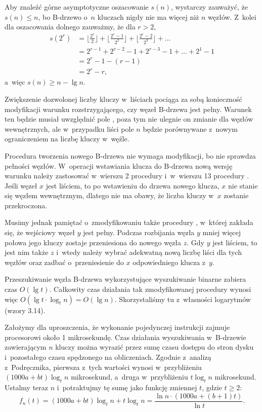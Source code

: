 Aby znaleźć górne asymptotyczne oszacowanie $s(n)$, wystarczy zauważyć, że $s(n)\le n$, bo B-drzewo o~$n$ kluczach nigdy nie ma więcej niż $n$ węzłów.
Z~kolei dla oszacowania dolnego zauważmy, że dla $r>2$,
\begin{align*}
	s(2^r) &= \biggl\lfloor\frac{2^r}{2}\biggr\rfloor+\biggl\lfloor\frac{2^r-1}{2^2}\biggr\rfloor+\biggl\lfloor\frac{2^r-2}{2^3}\biggr\rfloor+\dots \\
	&= 2^{r-1}+2^{r-2}-1+2^{r-3}-1+\dots+2^1-1 \\
	&= 2^r-1-(r-1) \\
	&= 2^r-r,
\end{align*}
a~więc $s(n)\ge n-\lg n$.

\exercise %
Zwiększenie dozwolonej liczby kluczy w~liściach pociąga za sobą konieczność modyfikacji warunku rozstrzygającego, czy węzeł B-drzewa jest pełny.
Warunek ten będzie musiał uwzględnić pole , poza tym nie ulegnie on zmianie dla węzłów wewnętrznych, ale w~przypadku liści pole $n$ będzie porównywane z~nowym ograniczeniem na liczbę kluczy w~węźle.

Procedura tworzenia nowego B-drzewa nie wymaga modyfikacji, bo nie sprawdza pełności węzłów.
W~operacji wstawiania klucza do B-drzewa nową wersję warunku należy zastosować w~wierszu 2 procedury  i~w~wierszu 13 procedury .
Jeśli węzeł $x$ jest liściem, to po wstawieniu do drzewa nowego klucza, $x$ nie stanie się węzłem wewnętrznym, dlatego nie ma obawy, że liczba kluczy w~$x$ zostanie przekroczona.

Musimy jednak pamiętać o~zmodyfikowaniu także procedury , w~której zakłada się, że wejściowy węzeł $y$ jest pełny.
Podczas rozbijania węzła $y$ mniej więcej połowa jego kluczy zostaje przeniesiona do nowego węzła $z$.
Gdy $y$ jest liściem, to jest nim także $z$ i~wtedy należy wybrać adekwatną nową liczbę liści dla tych węzłów oraz zadbać o~przeniesienie do $x$ odpowiedniego klucza z~$y$.

\exercise %
Przeszukiwanie węzła B-drzewa wykorzystujące wyszukiwanie binarne zabiera czas $O(\lg t)$.
Całkowity czas działania tak zmodyfikowanej procedury  wynosi więc $O(\lg t\cdot\log_tn)=O(\lg n)$.
Skorzystaliśmy tu z~własności logarytmów (wzory 3.14).

\exercise %

\noindent Założymy dla uproszczenia, że wykonanie pojedynczej instrukcji zajmuje procesorowi około 1 mikrosekundę.
Czas działania wyszukiwania w~B-drzewie zawierającym $n$ kluczy można wyrazić przez sumę czasu dostępu do stron dysku i~pozostałego czasu spędzonego na obliczeniach.
Zgodnie z~analizą z~Podręcznika, pierwsza z~tych wartości wynosi w~przybliżeniu $(1000a+bt)\log_tn$ mikrosekund, a~druga w~przybliżeniu $t\log_tn$ mikrosekund.
Ustalmy teraz $n$ i~potraktujmy tę sumę jako funkcję zmiennej $t$, gdzie $t\ge2$:
\[
	f_n(t) = (1000a+bt)\log_tn+t\log_tn = \frac{\ln n\cdot(1000a+(b+1)t)}{\ln t}.
\]

